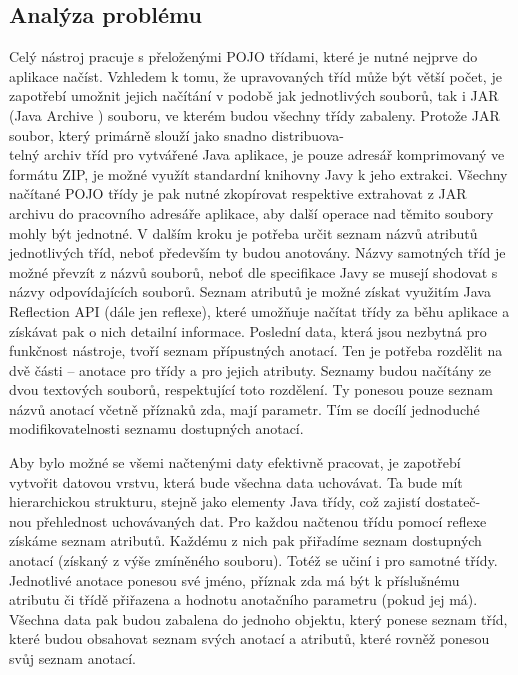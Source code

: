 \documentclass{projekt}
\begin{document}
\subsection{Analýza problému}
\hspace{0.65cm}Celý nástroj pracuje s přeloženými POJO třídami, které je nutné nejprve do aplikace načíst. Vzhledem k tomu, že upravovaných tříd může být větší počet, je zapotřebí umožnit jejich načítání v podobě jak jednotlivých souborů, tak i JAR (Java Archive \cite{devatenact}) souboru, ve kterém budou všechny třídy zabaleny. Protože JAR soubor, který primárně slouží jako snadno distribuova-\\telný archiv tříd pro vytvářené Java aplikace, je pouze adresář komprimovaný ve formátu ZIP, je možné využít standardní knihovny Javy k jeho extrakci. Všechny načítané POJO třídy je pak nutné zkopírovat respektive extrahovat z JAR archivu do pracovního adresáře aplikace, aby další operace nad těmito soubory mohly být jednotné. V dalším kroku je potřeba určit seznam názvů atributů jednotlivých tříd, neboť především ty budou anotovány. Názvy samotných tříd je možné převzít z názvů souborů, neboť dle specifikace Javy se musejí shodovat s názvy odpovídajících souborů. Seznam atributů je možné získat využitím Java Reflection API \cite{dvacetJedna} (dále jen reflexe), které umožňuje načítat třídy za běhu aplikace a získávat pak o nich detailní informace. Poslední data, která jsou nezbytná pro funkčnost nástroje, tvoří seznam přípustných anotací. Ten je potřeba rozdělit na dvě části – anotace pro třídy a pro jejich atributy. Seznamy budou načítány ze dvou textových souborů, respektující toto rozdělení. Ty ponesou pouze seznam názvů anotací včetně příznaků zda, mají parametr. Tím se docílí jednoduché modifikovatelnosti seznamu dostupných anotací.


Aby bylo možné se všemi načtenými daty efektivně pracovat, je zapotřebí vytvořit datovou vrstvu, která bude všechna data uchovávat. Ta bude mít hierarchickou strukturu, stejně jako elementy Java třídy, což zajistí dostateč-\\nou přehlednost uchovávaných dat. Pro každou načtenou třídu pomocí reflexe získáme seznam atributů. Každému z nich pak přiřadíme seznam dostupných anotací (získaný z výše zmíněného souboru). Totéž se učiní i pro samotné třídy. Jednotlivé anotace ponesou své jméno, příznak zda má být k příslušnému atributu či třídě přiřazena a hodnotu anotačního parametru (pokud jej má). Všechna data pak budou zabalena do jednoho objektu, který ponese seznam tříd, které budou obsahovat seznam svých anotací a atributů, které rovněž ponesou svůj seznam anotací.
\end{document}

